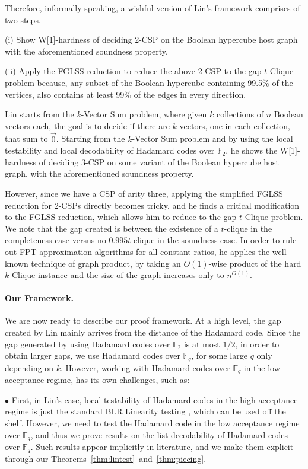 \documentclass[11pt]{article}
\newcommand{\F}{\mathbb{F}}
\begin{document}
Therefore, informally speaking, a wishful version of Lin's framework comprises of two steps.

(i)  Show W[1]-hardness of deciding 2-CSP on the Boolean hypercube host graph with the aforementioned soundness property. 

(ii) Apply the FGLSS reduction to reduce the above 2-CSP to the gap $t$-Clique problem because, any subset of the Boolean hypercube containing 99.5\% of the vertices, also contains at least 99\% of the edges in every direction.

Lin starts from the $k$-Vector Sum problem, where given $k$ collections of $n$ Boolean vectors each, the goal is to decide if there are $k$ vectors, one in each collection, that sum to $\vec{0}$. 
Starting from  the $k$-Vector Sum problem and by using the local testability and local decodability of Hadamard codes over $\F_2$, he shows the  W[1]-hardness of deciding 3-CSP on some variant of the Boolean hypercube host graph, with the aforementioned soundness property. 

However, since we have a CSP of arity three, applying the simplified FGLSS reduction for 2-CSPs directly becomes tricky,  and he finds a critical modification to the FGLSS reduction, which allows him to reduce to the gap $t$-Clique problem. We note that the gap created is between the existence of  a $t$-clique in the completeness case versus no $0.995t$-clique in the soundness case. In order to rule out FPT-approximation algorithms for all constant ratios, he applies the well-known technique of   graph product, by taking an $O(1)$-wise product  of the hard $k$-Clique instance and the size of the graph increases only to $n^{O(1)}$.


\paragraph{Our Framework.} We are now ready to describe our proof framework. At a high level, the gap created by Lin mainly arrives from the distance of the Hadamard code. Since the gap generated by using Hadamard codes over $\F_2$ is at most $1/2$,  in order to obtain larger gaps, we use Hadamard codes over $\F_q$, for some large  $q$ only depending on $k$.  However, working with Hadamard codes over $\F_q$ in the low acceptance regime, has its own challenges, such as:

$\bullet$ First, in Lin's case, local testability of Hadamard codes in the high acceptance regime is just the standard BLR Linearity testing \cite{BLR93}, which can be used off the shelf. However, we need to test the Hadamard code in the low acceptance regime over $\F_q$, and thus we prove results on the list decodability of Hadamard codes over $\F_q$. Such results appear implicitly in literature, and we make them explicit through our Theorems~\ref{thm:lintest}~and~\ref{thm:piecing}. 
\end{document}
